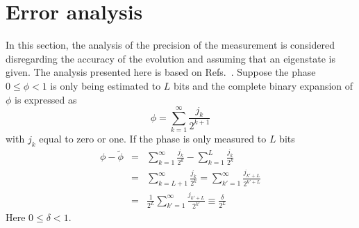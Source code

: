 \documentclass[11pt,oneside,final]{huthesis}%
\begin{document}
\section{Error analysis}\label{sec:peaerr}
In this section, the analysis of the precision of the measurement is considered disregarding the accuracy of the evolution and assuming that an eigenstate is given. 
The analysis presented here is based on Refs.~\cite{Dobsicek07, Knill07}.  Suppose the phase $0\leq\phi<1$ is only being estimated to $L$ bits and the complete binary expansion of $\phi$ is expressed as
\begin{equation*}
	\phi=\sum_{k=1}^\infty \frac{j_k}{2^{k+1}}
\end{equation*}
with $j_k$ equal to zero or one. If the phase is only measured to $L$ bits
\begin{eqnarray}
	\phi-\tilde{\phi}&=& \sum_{k=1}^\infty\frac{j_k}{2^{k}}-\sum_{k=1}^L\frac{j_k}{2^{k}}\nonumber\\
&=& \sum_{k=L+1}^\infty \frac{j_k}{2^{k}}=\sum_{k'=1}^{\infty}\frac{j_{k'+L}}{2^{k'+L}}\nonumber\\
&=& \frac{1}{2^{L}}\sum_{k'=1}^\infty\frac{j_{k'+L}}{2^{k'}}\equiv \frac{\delta}{2^{L}}\label{eq:10}
\end{eqnarray}
Here $0\leq\delta<1$.
\end{document}

